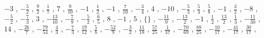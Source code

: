 \documentclass[12pt,fleqn]{article}
\theoremstyle{aufg}
\theoremstyle{bsp}
\begin{document}
\begin{flushleft}
$ \scriptstyle-3$ , $ \scriptstyle- \frac{5}{2}$ , $ \scriptstyle\frac{9}{2}$ , $ \scriptstyle\frac{1}{7}$ , $ \scriptstyle7$ , $ \scriptstyle\frac{9}{10}$ , $ \scriptstyle-1$ , $ \scriptstyle\frac{1}{2}$ , $ \scriptstyle-1$ , $ \scriptstyle\frac{7}{10}$ , $ \scriptstyle- \frac{3}{4}$ , $ \scriptstyle4$ , $ \scriptstyle-10$ , $ \scriptstyle- \frac{5}{3}$ , $ \scriptstyle\frac{5}{3}$ , $ \scriptstyle\frac{5}{8}$ , $ \scriptstyle-1$ , $ \scriptstyle\frac{3}{2}$ , $ \scriptstyle-8$ , $ \scriptstyle- \frac{5}{2}$ , $ \scriptstyle- \frac{7}{3}$ , $ \scriptstyle3$ , $ \scriptstyle- \frac{13}{10}$ , $ \scriptstyle- \frac{7}{9}$ , $ \scriptstyle- \frac{5}{2}$ , $ \scriptstyle\frac{6}{5}$ , $ \scriptstyle8$ , $ \scriptstyle-1$ , $ \scriptstyle5$ , $ \scriptstyle\{\}$ , $ \scriptstyle- \frac{11}{9}$ , $ \scriptstyle- \frac{13}{2}$ , $ \scriptstyle-1$ , $ \scriptstyle\frac{1}{2}$ , $ \scriptstyle\frac{13}{2}$ , $ \scriptstyle\frac{1}{3}$ , $ \scriptstyle- \frac{11}{30}$ , $ \scriptstyle14$ , $ \scriptstyle- \frac{26}{7}$ , $ \scriptstyle- \frac{79}{54}$ , $ \scriptstyle\frac{4}{3}$ , $ \scriptstyle- \frac{7}{3}$ , $ \scriptstyle\frac{19}{12}$ , $ \scriptstyle\frac{5}{8}$ , $ \scriptstyle- \frac{52}{9}$ , $ \scriptstyle- \frac{3}{2}$ , $ \scriptstyle\frac{11}{18}$ , $ \scriptstyle\frac{57}{25}$ , $ \scriptstyle\frac{1}{37}$ , $ \scriptstyle- \frac{70}{69}$ , $ \scriptstyle\frac{88}{25}$ , $ \scriptstyle- \frac{10}{17}$ , $ \scriptstyle- \frac{41}{17}$ , $ \scriptstyle\frac{30}{17}$ , \end{flushleft} 
    
\end{document}
